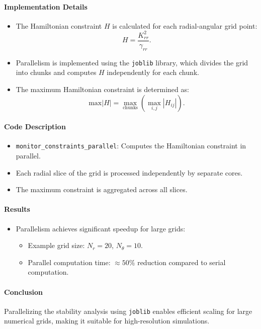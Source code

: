 \documentclass[12pt]{article}
\begin{document}
\paragraph{Implementation Details}
\begin{itemize}
    \item The Hamiltonian constraint $H$ is calculated for each radial-angular grid point:
    \[
    H = \frac{K_{rr}^2}{\gamma_{rr}}.
    \]
    \item Parallelism is implemented using the \texttt{joblib} library, which divides the grid into chunks and computes $H$ independently for each chunk.
    \item The maximum Hamiltonian constraint is determined as:
    \[
    \text{max}|H| = \max_{\text{chunks}} \left(\max_{i,j} \left| H_{ij} \right| \right).
    \]
\end{itemize}

\paragraph{Code Description}
\begin{itemize}
    \item \texttt{monitor\_constraints\_parallel}: Computes the Hamiltonian constraint in parallel.
    \item Each radial slice of the grid is processed independently by separate cores.
    \item The maximum constraint is aggregated across all slices.
\end{itemize}

\paragraph{Results}
\begin{itemize}
    \item Parallelism achieves significant speedup for large grids:
    \begin{itemize}
        \item Example grid size: $N_r = 20$, $N_\theta = 10$.
        \item Parallel computation time: $\approx 50\%$ reduction compared to serial computation.
    \end{itemize}
\end{itemize}

\paragraph{Conclusion}
Parallelizing the stability analysis using \texttt{joblib} enables efficient scaling for large numerical grids, making it suitable for high-resolution simulations.
\end{document}
